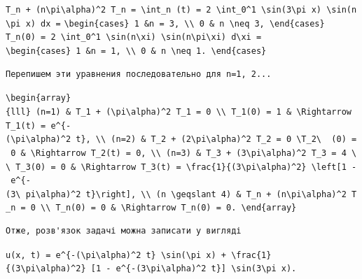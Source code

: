 \documentclass[
  ukrainian,
]{article}
\begin{document}
\texttt{T\_n\ +\ (n\textbackslash{}pi\textbackslash{}alpha)\^{}2\ T\_n\ =\ \textbackslash{}int\_n\ (t)\ =\ 2\ \textbackslash{}int\_0\^{}1\ \textbackslash{}sin(3\textbackslash{}pi\ x)\ \textbackslash{}sin(n\textbackslash{}pi\ x)\ dx\ =}
\texttt{\textbackslash{}begin\{cases\}\ 1\ \&n\ =\ 3,\ \textbackslash{}\textbackslash{}\ 0\ \&\ n\ \textbackslash{}neq\ 3,\ \textbackslash{}end\{cases\}}
\texttt{T\_n(0)\ =\ 2\ \textbackslash{}int\_0\^{}1\ \textbackslash{}sin(n\textbackslash{}xi)\ \textbackslash{}sin(n\textbackslash{}pi\textbackslash{}xi)\ d\textbackslash{}xi\ =}
\texttt{\textbackslash{}begin\{cases\}\ 1\ \&n\ =\ 1,\ \textbackslash{}\textbackslash{}\ 0\ \&\ n\ \textbackslash{}neq\ 1.\ \textbackslash{}end\{cases\}}

\begin{verbatim}
Перепишем эти уравнения последовательно для n=1, 2...
\end{verbatim}

\texttt{\textbackslash{}begin\{array\}\{lll\}\ (n=1)\ \&\ T\_1\textquotesingle{}\ +\ (\textbackslash{}pi\textbackslash{}alpha)\^{}2\ T\_1\ =\ 0\ \textbackslash{}\textbackslash{}\ T\_1(0)\ =\ 1\ \&\ \textbackslash{}Rightarrow\ T\_1(t)\ =\ e\^{}\{-(\textbackslash{}pi\textbackslash{}alpha)\^{}2\ t\},\ \textbackslash{}\textbackslash{}\ (n=2)\ \&\ T\_2\textquotesingle{}\ +\ (2\textbackslash{}pi\textbackslash{}alpha)\^{}2\ T\_2\ =\ 0\ \textbackslash{}T\_2\textbackslash{}\ \ (0)\ =\ 0\ \&\ \textbackslash{}Rightarrow\ T\_2(t)\ =\ 0,\ \textbackslash{}\textbackslash{}\ (n=3)\ \&\ T\_3\textquotesingle{}\ +\ (3\textbackslash{}pi\textbackslash{}alpha)\^{}2\ T\_3\ =\ 4\ \textbackslash{}\textbackslash{}\ T\_3(0)\ =\ 0\ \&\ \textbackslash{}Rightarrow\ T\_3(t)\ =\ \textbackslash{}frac\{1\}\{(3\textbackslash{}pi\textbackslash{}alpha)\^{}2\}\ \textbackslash{}left{[}1\ -\ e\^{}\{-(3\textbackslash{}\ pi\textbackslash{}alpha)\^{}2\ t\}\textbackslash{}right{]},\ \textbackslash{}\textbackslash{}\ (n\ \textbackslash{}geqslant\ 4)\ \&\ T\_n\textquotesingle{}\ +\ (n\textbackslash{}pi\textbackslash{}alpha)\^{}2\ T\_n\ =\ 0\ \textbackslash{}\textbackslash{}\ T\_n(0)\ =\ 0\ \&\ \textbackslash{}Rightarrow\ T\_n(0)\ =\ 0.\ \textbackslash{}end\{array\}}

\begin{verbatim}
Отже, розв'язок задачі можна записати у вигляді
\end{verbatim}

\texttt{u(x,\ t)\ =\ e\^{}\{-(\textbackslash{}pi\textbackslash{}alpha)\^{}2\ t\}\ \textbackslash{}sin(\textbackslash{}pi\ x)\ +\ \textbackslash{}frac\{1\}\{(3\textbackslash{}pi\textbackslash{}alpha)\^{}2\}\ {[}1\ -\ e\^{}\{-(3\textbackslash{}pi\textbackslash{}alpha)\^{}2\ t\}{]}\ \textbackslash{}sin(3\textbackslash{}pi\ x).}
\end{document}
